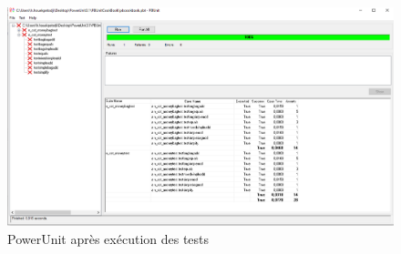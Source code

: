 \documentclass[french]{article}
\theoremstyle{definition}
\begin{document}
\begin{itemize}
\begin{figure}[!htbp]
    \begin{center}
    \includegraphics[width=.8\linewidth]{./testPassed.png}
    \caption{PowerUnit après exécution des tests}
    \label{fig:testPassed}
    \end{center}
  \end{figure}
\end{itemize}
\end{document}
